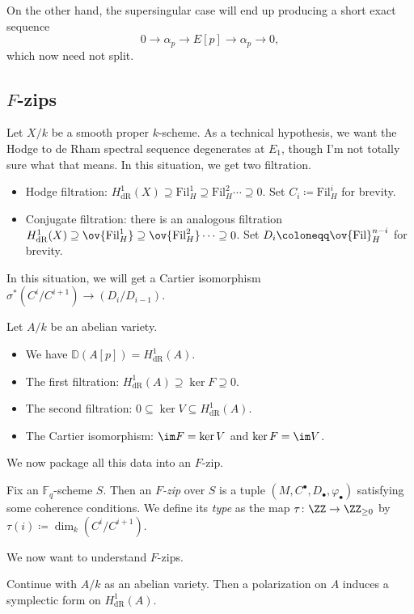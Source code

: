 \documentclass{article}
\begin{document}
On the other hand, the supersingular case will end up producing a short exact sequence
\[0\to\alpha_p\to E[p]\to\alpha_p\to0,\]
which now need not split.

\subsection{\texorpdfstring{$F$}{ F}-zips}
Let $X/k$ be a smooth proper $k$-scheme. As a technical hypothesis, we want the Hodge to de Rham spectral sequence degenerates at $E_1$, though I'm not totally sure what that means. In this situation, we get two filtration.
\begin{itemize}
	\item Hodge filtration: $H^1_{\mathrm{dR}}(X)\supseteq\mathrm{Fil}^1_H\supseteq\mathrm{Fil}^2_H\cdots\supseteq0$. Set $C_i\coloneqq\mathrm{Fil}^i_H$ for brevity.
	\item Conjugate filtration: there is an analogous filtration $H^1_{\mathrm{dR}}(X)\supseteq\ov{\mathrm{Fil}^1_H}\supseteq\ov{\mathrm{Fil}^2_H}\cdots\supseteq0$. Set $D_i\coloneqq\ov{\mathrm{Fil}}_H^{n-i}$ for brevity.
\end{itemize}
In this situation, we will get a Cartier isomorphism $\sigma^*(C^i/C^{i+1})\to(D_i/D_{i-1})$.
\begin{example}
	Let $A/k$ be an abelian variety.
	\begin{itemize}
		\item We have $\mathbb D(A[p])=H^1_{\mathrm{dR}}(A)$.
		\item The first filtration: $H^1_{\mathrm{dR}}(A)\supseteq\ker F\supseteq0$.
		\item The second filtration: $0\subseteq\ker V\subseteq H^1_{\mathrm{dR}}(A)$.
		\item The Cartier isomorphism: $\im F=\ker V$ and $\ker F=\im V$.
	\end{itemize}
\end{example}
We now package all this data into an $F$-zip.
\begin{definition}[$F$-zip]
	Fix an $\mathbb F_q$-scheme $S$. Then an \textit{$F$-zip} over $S$ is a tuple $(M, C^\bullet, D_\bullet,\varphi_\bullet)$ satisfying some coherence conditions. We define its \textit{type} as the map $\tau\colon\ZZ\to\ZZ_{\ge0}$ by $\tau(i)\coloneqq\dim_k\left(C^i/C^{i+1}\right)$.
\end{definition}
We now want to understand $F$-zips.
\begin{refcontext}
	Continue with $A/k$ as an abelian variety. Then a polarization on $A$ induces a symplectic form on $H^1_{\mathrm{dR}}(A)$.
\end{refcontext}
\end{document}
